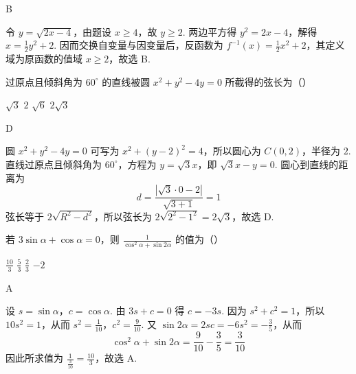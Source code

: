 \begin{answer}
B
\end{answer}

\begin{solution}
令 \(y=\sqrt{2x-4}\)，由题设 \(x\geqslant4\)，故 \(y\geqslant2\). 两边平方得
\(y^{2}=2x-4\)，解得 \(x=\frac{1}{2}y^{2}+2\). 因而交换自变量与因变量后，反函数为
\(f^{-1}\left(x\right)=\frac{1}{2}x^{2}+2\)，其定义域为原函数的值域 \(x\geqslant2\)，故选 B.
\end{solution}

\begin{problem}
过原点且倾斜角为 \(60^{\circ}\) 的直线被圆 \(x^{2} + y^{2} - 4y = 0\) 所截得的弦长为（\quad）

\choices
    {\(\sqrt{3}\)}
    {\(2\)}
    {\( \sqrt{6} \)}
    {\(2\sqrt{3}\)}

\end{problem}

\begin{answer}
D
\end{answer}

\begin{solution}
圆 \(x^{2}+y^{2}-4y=0\) 可写为 \(x^{2}+\left(y-2\right)^{2}=4\)，所以圆心为 \(C\left(0,2\right)\)，半径为 \(2\). 直线过原点且倾斜角为 \(60^{\circ}\)，方程为 \(y=\sqrt{3}x\)，即 \(\sqrt{3}x-y=0\). 圆心到直线的距离为
\[
d=\frac{|\sqrt{3}\cdot0-2|}{\sqrt{3+1}}=1
\]
弦长等于 \(2\sqrt{R^{2}-d^{2}}\)，所以弦长为
\(2\sqrt{2^{2}-1^{2}}=2\sqrt{3}\)，故选 D.
\end{solution}

\begin{problem}
若 \(3\sin \alpha + \cos \alpha = 0\)，则 \(\frac{1}{\cos^2\alpha + \sin 2\alpha}\) 的值为（\quad）

\choices
    {\(\frac{10}{3}\)}
    {\( \frac{5}{3} \)}
    {\( \frac{2}{3} \)}
    {\(-2\)}

\end{problem}

\begin{answer}
A
\end{answer}

\begin{solution}
设 \(s=\sin\alpha\)，\(c=\cos\alpha\). 由 \(3s+c=0\) 得 \(c=-3s\). 因为 \(s^{2}+c^{2}=1\)，所以
\(10s^{2}=1\)，从而 \(s^{2}=\frac{1}{10}\)，\(c^{2}=\frac{9}{10}\).
又
\(\sin2\alpha=2sc=-6s^{2}=-\frac{3}{5}\)，从而
\[
\cos^{2}\alpha+\sin2\alpha=\frac{9}{10}-\frac{3}{5}=\frac{3}{10}
\]
因此所求值为 \(\frac{1}{\frac{3}{10}}=\frac{10}{3}\)，故选 A.
\end{solution}


